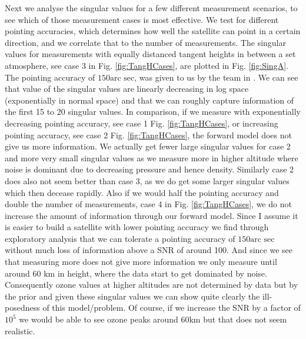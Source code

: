 Next we analyse the singular values for a few different measurement scenarios, to see which of those measurement cases is most effective.
We test for different pointing accuracies, which determines how well the satellite can point in a certain direction, and we correlate that to the number of measurements.
The singular values for measurements with equally distanced tangent heights in between a set atmosphere, see case 3 in Fig. \ref{fig:TangHCases}, are plotted in Fig. \ref{fig:SingA}.
The pointing accuracy of $150\text{arc sec}$, was given to us by the team in \cite{CubeSatInternal}.
We can see that value of the singular values are linearly decreasing in log space (exponentially in normal space) and that we can roughly capture information of the first 15 to 20 singular values. 
In comparison, if we measure with exponentially decreasing pointing accuracy, see case 1 Fig. \ref{fig:TangHCases}, or increasing pointing accuracy, see case 2 Fig. \ref{fig:TangHCases}, the forward model does not give us more information.
We actually get fewer large singular values for case 2 and more very small singular values as we measure more in higher altitude where noise is dominant due to decreasing pressure and hence density.
Similarly case 2 does also not seem better than case 3, as we do get some larger singular values which then decease rapidly.
Also if we would half the pointing accuracy and double the number of measurements, case 4 in Fig. \ref{fig:TangHCases}, we do not increase the amount of information through our forward model.
Since I assume it is easier to build a satellite with lower pointing accuracy we find through exploratory analysis that we can tolerate a pointing accuracy of $150\text{arc sec}$ without much loss of information above a SNR of around 100.
And since we see that measuring more does not give more information we only measure until around 60 km in height, where the data start to get dominated by noise.
Consequently ozone values at higher altitudes are not determined by data but by the prior and given these singular values we can show quite clearly the ill-posedness of this model/problem.
Of course, if we increase the SNR by a factor of $10^5$ we would be able to see ozone peaks around 60km but that does not seem realistic.

